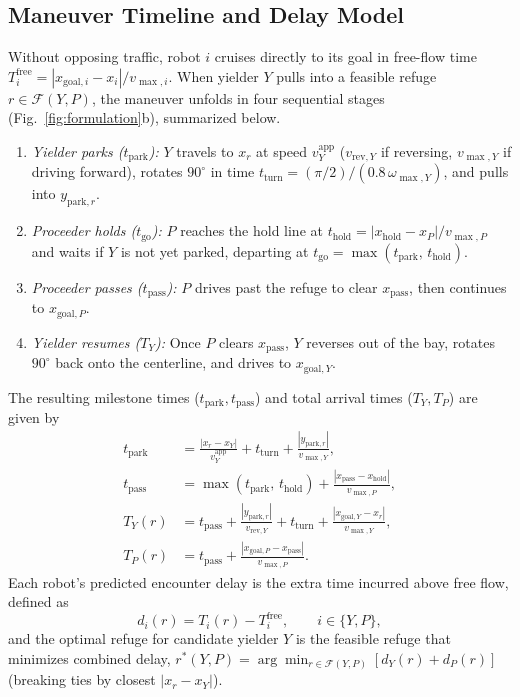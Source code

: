 \subsection{Maneuver Timeline and Delay Model}
Without opposing traffic, robot $i$ cruises directly to its goal in free-flow time $T_i^{\mathrm{free}} = |x_{\mathrm{goal},i} - x_i| / v_{\max,i}$.
When yielder $Y$ pulls into a feasible refuge $r \in \mathcal{F}(Y, P)$, the maneuver unfolds in four sequential stages (Fig.~\ref{fig:formulation}b), summarized below.
\begin{enumerate}
\item \emph{Yielder parks ($t_{\mathrm{park}}$):} $Y$ travels to $x_r$ at speed $v_Y^{\mathrm{app}}$ ($v_{\mathrm{rev},Y}$ if reversing, $v_{\max,Y}$ if driving forward), rotates $90^\circ$ in time $t_{\mathrm{turn}} = (\pi/2)/(0.8\,\omega_{\max,Y})$, and pulls into $y_{\mathrm{park},r}$.
\item \emph{Proceeder holds ($t_{\mathrm{go}}$):} $P$ reaches the hold line at $t_{\mathrm{hold}} = |x_{\mathrm{hold}} - x_P| / v_{\max,P}$ and waits if $Y$ is not yet parked, departing at $t_{\mathrm{go}} = \max(t_{\mathrm{park}},\, t_{\mathrm{hold}})$.
\item \emph{Proceeder passes ($t_{\mathrm{pass}}$):} $P$ drives past the refuge to clear $x_{\mathrm{pass}}$, then continues to $x_{\mathrm{goal},P}$.
\item \emph{Yielder resumes ($T_Y$):} Once $P$ clears $x_{\mathrm{pass}}$, $Y$ reverses out of the bay, rotates $90^\circ$ back onto the centerline, and drives to $x_{\mathrm{goal},Y}$.
\end{enumerate}
The resulting milestone times ($t_{\mathrm{park}}, t_{\mathrm{pass}}$) and total arrival times ($T_Y, T_P$) are given by
\begin{equation}
\begin{aligned}
t_{\mathrm{park}} &= \frac{|x_r - x_Y|}{v_Y^{\mathrm{app}}} + t_{\mathrm{turn}} + \frac{|y_{\mathrm{park},r}|}{v_{\max,Y}}, \\
t_{\mathrm{pass}} &= \max(t_{\mathrm{park}},\, t_{\mathrm{hold}}) + \frac{|x_{\mathrm{pass}} - x_{\mathrm{hold}}|}{v_{\max,P}}, \\
T_Y(r) &= t_{\mathrm{pass}} + \frac{|y_{\mathrm{park},r}|}{v_{\mathrm{rev},Y}} + t_{\mathrm{turn}} + \frac{|x_{\mathrm{goal},Y} - x_r|}{v_{\max,Y}}, \\
T_P(r) &= t_{\mathrm{pass}} + \frac{|x_{\mathrm{goal},P} - x_{\mathrm{pass}}|}{v_{\max,P}}.
\end{aligned}
\label{eq:timeline}
\end{equation}
Each robot's predicted encounter delay is the extra time incurred above free flow, defined as
\begin{equation}
d_i(r) = T_i(r) - T_i^{\mathrm{free}}, \qquad i \in \{Y, P\},
\label{eq:delay_def}
\end{equation}
and the optimal refuge for candidate yielder $Y$ is the feasible refuge that minimizes combined delay, $r^\ast(Y, P) = \arg\min_{r \in \mathcal{F}(Y, P)} [d_Y(r) + d_P(r)]$ (breaking ties by closest $|x_r - x_Y|$).

